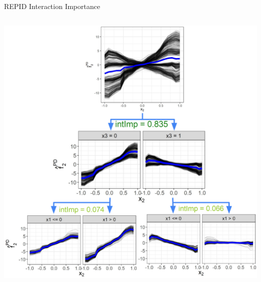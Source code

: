 \documentclass[11pt,compress,t,notes=noshow, aspectratio=169, xcolor=table,dvipsnames]{beamer}
\begin{document}
\begin{frame}{REPID Interaction Importance}
\begin{columns}[T, totalwidth=\textwidth]
\begin{column}{0.52\textwidth}
    \centering
    \includegraphics[width=\textwidth]{figure/sim1}
    

\end{column}
\end{columns}
\end{frame}
\end{document}
